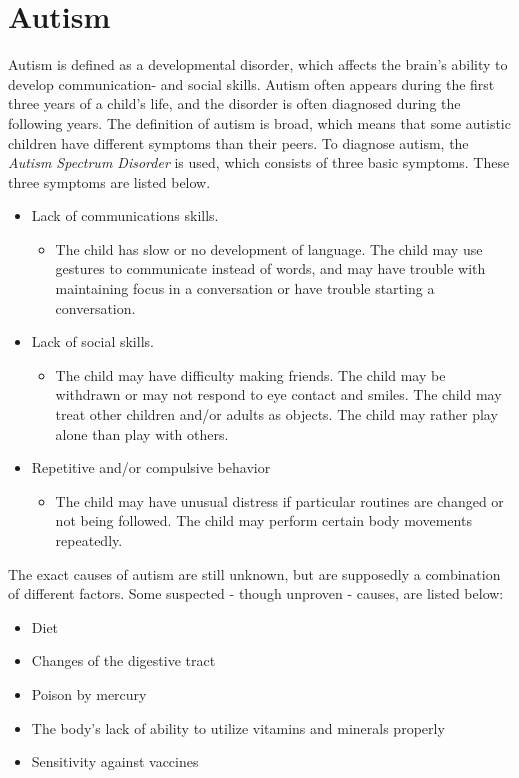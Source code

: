 \section{Autism}
Autism is defined as a developmental disorder, which affects the brain's ability to develop communication- and social skills. Autism often appears during the first three years of a child's life, and the disorder is often diagnosed during the following years. The definition of autism is broad, which means that some autistic children have different symptoms than their peers. To diagnose autism, the \emph{Autism Spectrum Disorder} is used, which consists of three basic symptoms. These three symptoms are listed below.
\begin{itemize}

  \item{Lack of communications skills.}
   \begin{itemize}
     \item{The child has slow or no development of language. The child may use gestures to communicate instead of words, and may have trouble with maintaining focus in a conversation or have trouble starting a conversation.}
   \end{itemize}
   
  \item{Lack of social skills.}
   \begin{itemize}
     \item{The child may have difficulty making friends. The child may be withdrawn or may not respond to eye contact and smiles. The child may treat other children and/or adults as objects. The child may rather play alone than play with others.}
   \end{itemize}

  \item{Repetitive and/or compulsive behavior}
    \begin{itemize}
      \item{The child may have unusual distress if particular routines are changed or not being followed. The child may perform certain body movements repeatedly. \cite{autism}}
    \end{itemize}
  
\end{itemize}

The exact causes of autism are still unknown, but are supposedly a combination of different factors. Some suspected - though unproven - causes, are listed below:

\begin{itemize}
  
  \item{Diet}
  \item{Changes of the digestive tract}
  \item{Poison by mercury}
  \item{The body's lack of ability to utilize vitamins and minerals properly}
  \item{Sensitivity against vaccines\cite{autism}}
  
\end{itemize}


